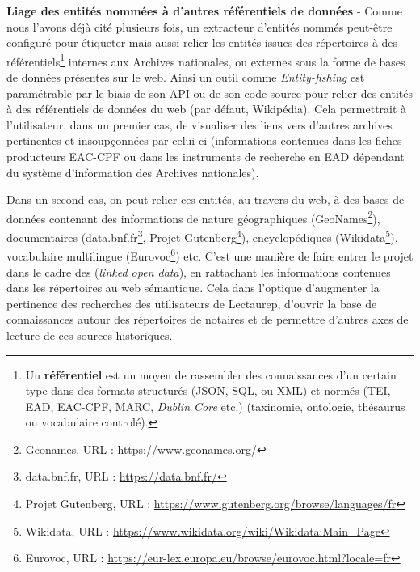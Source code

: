 \newpage
\textbf{Liage des entités nommées à d'autres référentiels de données} - Comme nous l'avons déjà cité plusieurs fois, un extracteur d'entités nommés peut-être configuré pour étiqueter mais aussi relier les entités issues des répertoires à des référentiels\footnote{Un \textbf{référentiel} est un moyen de rassembler des connaissances d'un certain type dans des formats structurés (JSON, SQL, ou XML) et normés (TEI, EAD, EAC-CPF, MARC, \textit{Dublin Core} etc.) (taxinomie, ontologie, thésaurus ou vocabulaire controlé).} internes aux Archives nationales, ou externes sous la forme de bases de données présentes sur le web. Ainsi un outil comme \textit{Entity-fishing} est paramétrable par le biais de son API ou de son code source pour relier des entités à des référentiels de données du web (par défaut, Wikipédia). Cela permettrait à l'utilisateur, dans un premier cas, de visualiser des liens vers d'autres archives pertinentes et insoupçonnées par celui-ci (informations contenues dans les fiches producteurs EAC-CPF ou dans les instruments de recherche en EAD dépendant du système d'information des Archives nationales). 

Dans un second cas, on peut relier ces entités, au travers du web, à des bases de données contenant des informations de nature géographiques (GeoNames\footnote{Geonames, URL : \url{https://www.geonames.org/}}), documentaires (data.bnf.fr\footnote{data.bnf.fr, URL : \url{https://data.bnf.fr/}}, Projet Gutenberg\footnote{Projet Gutenberg, URL : \url{https://www.gutenberg.org/browse/languages/fr}}), encyclopédiques (Wikidata\footnote{Wikidata, URL : \url{https://www.wikidata.org/wiki/Wikidata:Main_Page}}), vocabulaire multilingue (Eurovoc\footnote{Eurovoc, URL : \url{https://eur-lex.europa.eu/browse/eurovoc.html?locale=fr}}) etc. C'est une manière de faire entrer le projet dans le cadre des  (\textit{linked open data}), en rattachant les informations contenues dans les répertoires au web sémantique. Cela dans l'optique d'augmenter la pertinence des recherches des utilisateurs de Lectaurep, d'ouvrir la base de connaissances autour des répertoires de notaires et de permettre d'autres axes de lecture de ces sources historiques.\\

